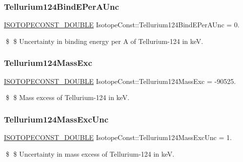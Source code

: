 \subsubsection{\texorpdfstring{Tellurium124\+Bind\+E\+Per\+A\+Unc}{Tellurium124BindEPerAUnc}}
{\footnotesize\ttfamily \mbox{\hyperlink{group___isotope_const-_macros_ga8f45a7272ce02c0b4c65c44636ed719a}{I\+S\+O\+T\+O\+P\+E\+C\+O\+N\+S\+T\+\_\+\+D\+O\+U\+B\+LE}} Isotope\+Const\+::\+Tellurium124\+Bind\+E\+Per\+A\+Unc = 0.}

\$ \$ Uncertainty in binding energy per A of Tellurium-\/124 in keV. \mbox{\label{group___isotope_const-_tellurium-_te124_gae2e573e035f67fc7f7ef920cf328bb75}} 
\subsubsection{\texorpdfstring{Tellurium124\+Mass\+Exc}{Tellurium124MassExc}}
{\footnotesize\ttfamily \mbox{\hyperlink{group___isotope_const-_macros_ga8f45a7272ce02c0b4c65c44636ed719a}{I\+S\+O\+T\+O\+P\+E\+C\+O\+N\+S\+T\+\_\+\+D\+O\+U\+B\+LE}} Isotope\+Const\+::\+Tellurium124\+Mass\+Exc = -\/90525.}

\$ \$ Mass excess of Tellurium-\/124 in keV. \mbox{\label{group___isotope_const-_tellurium-_te124_gaa3af81fa62605b521632d3fbb95edc56}} 
\subsubsection{\texorpdfstring{Tellurium124\+Mass\+Exc\+Unc}{Tellurium124MassExcUnc}}
{\footnotesize\ttfamily \mbox{\hyperlink{group___isotope_const-_macros_ga8f45a7272ce02c0b4c65c44636ed719a}{I\+S\+O\+T\+O\+P\+E\+C\+O\+N\+S\+T\+\_\+\+D\+O\+U\+B\+LE}} Isotope\+Const\+::\+Tellurium124\+Mass\+Exc\+Unc = 1.}

\$ \$ Uncertainty in mass excess of Tellurium-\/124 in keV. \mbox{\label{group___isotope_const-_tellurium-_te124_gacbe08317563899a2254aafa0cc58729c}} 
